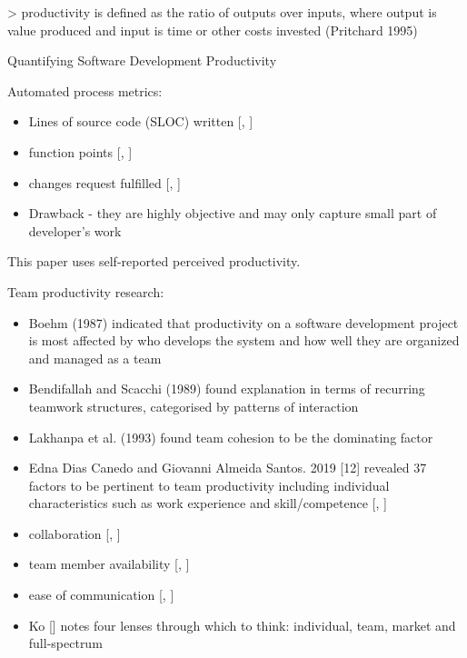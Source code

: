 > productivity is defined as the ratio of outputs over inputs, where output is value produced and input is time or other costs invested (Pritchard 1995) \cite{pritchard1995productivity}

Quantifying Software Development Productivity

Automated process metrics:

\begin{itemize}
    \item Lines of source code (SLOC) written [\cite{devanbuAnalyticalEmpiricalEvaluation1996}, \cite{walstonMethodProgrammingMeasurement1977}]
    \item function points [\cite{albrecht1979measuring}, \cite{computerstaffSoftwareMetricsGood1994}]
    \item changes request fulfilled [\cite{cataldoSociotechnicalCongruenceFramework2008}, \cite{millerHowWasYour2021}]
    \item Drawback - they are highly objective and may only capture small part of developer's work
\end{itemize}

This paper uses self-reported perceived productivity.

Team productivity research:

\begin{itemize}
    \item  Boehm (1987) \cite{boehmImprovingSoftwareProductivity1987} indicated that productivity on a software development project is most affected by who develops the system and how well they are organized and managed as a team
    \item Bendifallah and Scacchi (1989) \cite{bendifallahWorkStructuresShifts1989} found explanation in terms of recurring teamwork structures, categorised by patterns of interaction
    \item Lakhanpa et al. (1993) \cite{lakhanpalUnderstandingFactorsInfluencing1993} found team cohesion to be the dominating factor
    \item Edna Dias Canedo and Giovanni Almeida Santos. 2019 [12] \cite{canedoFactorsAffectingSoftware2019} revealed 37 factors to be pertinent to team productivity including individual characteristics such as work experience \cite{deo.meloInterpretativeCaseStudies2013} and skill/competence [\cite{maxwellBenchmarkingSoftwareDevelopmentProductivity2000}, \cite{oliveiraSoftwareProjectManagers2016}]
    \item collaboration [\cite{clincySoftwareDevelopmentProductivity2003}, \cite{stephanidisHCIInternational20152015}]
    \item team member availability [\cite{meloInterpretativeCaseStudies2013}, \cite{maxwellBenchmarkingSoftwareDevelopmentProductivity2000}]
    \item ease of communication [\cite{wagnerSystematicReviewProductivity2018}, \cite{yilmazEffectiveSocialProductivity2016}]
    \item Ko [\cite{koIndividualTeamOrganization2019}] notes four lenses through which to think: individual, team, market and full-spectrum
\end{itemize}

